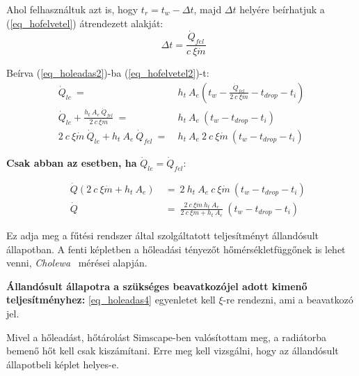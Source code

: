 Ahol felhasználtuk azt is, hogy $t_r = t_w-\Delta t$, majd $\Delta t$ helyére beírhatjuk a (\ref{eq_hofelvetel})  átrendezett alakját:
\begin{equation} \label{eq_hofelvetel2}
~~\Delta t = \frac{\dot Q_{fel}}{c ~ \xi\dot{m}}
\end{equation}

Beírva (\ref{eq_holeadas2})-ba (\ref{eq_hofelvetel2})-t:
\begin{equation} \label{holeadas3}
\begin{aligned}
\dot Q_{le} ~=~ & h_t~ A_e\left( t_w-\frac{\dot Q_{fel}}{2~c ~ \xi\dot{m}}-t_{drop}-t_i\right)  \\[18pt]
\dot Q_{le} + \frac{h_t ~ A_e ~ \dot Q_{fel}}{2 ~ c ~ \xi\dot{m}} ~ = ~ & h_t ~ A_e ~\left( t_w-t_{drop}-t_i\right) \\[24pt]
2 ~ c ~ \xi\dot{m} ~ \dot Q_{le} + h_t ~ A_e ~ \dot Q_{fel} ~ = ~ &  h_t ~ A_e ~ 2~ c~ \xi\dot{m} ~\left( t_w-t_{drop}-t_i\right)
\end{aligned}
\end{equation}

\textbf{Csak abban az esetben, ha} $\dot Q_{le}=\dot Q_{fel}$:



\begin{equation} \label{eq_holeadas4}
\begin{aligned}
~~~~~~\dot Q (2 ~ c ~ \xi\dot{m} + h_t ~ A_e) & ~=~ 2 ~ h_t ~ A_e ~ c~ \xi\dot{m} ~(t_w-t_{drop}-t_i) \\[18pt]
~~~~~~\dot Q &~=~ \frac{2~c~\xi\dot{m}~h_t~A_e}{2 ~c ~ \xi\dot{m} + h_t ~ A_e}~(t_w-t_{drop}-t_i)
\end{aligned}
\end{equation}

Ez adja meg a fűtési rendszer által szolgáltatott teljesítményt állandósult állapotban.
A fenti képletben a hőleadási tényezőt hőmérsékletfüggőnek is lehet venni, \textit{Cholewa}~\cite{CHOLEWA2013599} mérései alapján.

\textbf{Állandósult állapotra a szükséges beavatkozójel adott kimenő teljesítményhez:} \ref{eq_holeadas4} egyenletet kell $\xi$-re rendezni, ami a beavatkozó jel.

Mivel a hőleadást, hőtárolást Simscape-ben valósítottam meg, a radiátorba bemenő hőt kell csak kiszámítani. Erre meg kell vizsgálni, hogy az állandósult állapotbeli képlet helyes-e.

